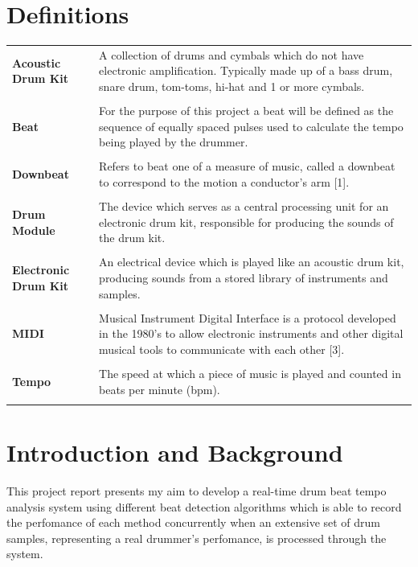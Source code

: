 \documentclass[a4paper, 11pt]{article}
\begin{document}
\section*{Definitions}
\begin{tabular}{l p{4.5in}}\\
\textbf{Acoustic Drum Kit} & A collection of drums and cymbals which do not have electronic amplification. Typically made up of a bass drum, snare drum, tom-toms, hi-hat and 1 or more cymbals.\\\\
\textbf{Beat} & For the purpose of this project a beat will be defined as the sequence of equally spaced pulses used to calculate the tempo being played by the drummer.\\\\
\textbf{Downbeat} & Refers to beat one of a measure of music, called a downbeat to correspond to the motion a conductor's arm [1].\\\\
\textbf{Drum Module} & The device which serves as a central processing unit for an electronic drum kit, responsible for producing the sounds of the drum kit.\\\\
\textbf{Electronic Drum Kit} & An electrical device which is played like an acoustic drum kit, producing sounds from a stored library of instruments and samples.\\\\
\textbf{MIDI} & Musical Instrument Digital Interface is a protocol developed in the 1980's to allow electronic instruments and other digital musical tools to communicate with each other [3].\\\\
\textbf{Tempo} & The speed at which a piece of music is played \cite{oxford-comp} and counted in beats per minute (bpm).\\\\
\end{tabular}
\clearpage

\maketitle{} \section{Introduction and Background}

This project report presents my aim to develop a real-time drum beat tempo analysis system using different beat detection algorithms which is able to record the perfomance of each method concurrently when an extensive set of drum samples, representing a real drummer's perfomance, is processed through the system.
\end{document}
